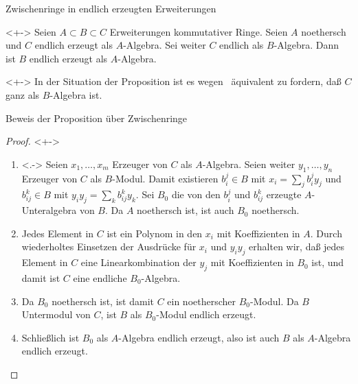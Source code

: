 \begin{frame}{Zwischenringe in endlich erzeugten Erweiterungen}
	\begin{proposition}<+->
		\label{prop:intermediate_ring}
		Seien \(A \subset B \subset C\) Erweiterungen kommutativer Ringe. Seien \(A\) noethersch
		und \(C\) endlich erzeugt als \(A\)-Algebra. Sei weiter \(C\) endlich als \(B\)-Algebra.
		Dann ist \(B\) endlich erzeugt als \(A\)-Algebra.
	\end{proposition}
	\begin{remark}<+->
		In der Situation der Proposition ist es wegen~ äquivalent zu fordern, daß \(C\) ganz als \(B\)-Algebra ist.
	\end{remark}
\end{frame}

\begin{frame}{Beweis der Proposition über Zwischenringe}
	\begin{proof}<+->
		\begin{enumerate}[<+->]
		\item<.->
			Seien \(x_1, \dotsc, x_m\) Erzeuger von \(C\) als \(A\)-Algebra. Seien weiter
			\(y_1, \dotsc, y_n\) Erzeuger von \(C\) als \(B\)-Modul. Damit existieren
			\(b_i^j \in B\) mit \(x_i = \sum\limits_j b_i^j y_j\) und \(b_{ij}^k \in B\)
			mit \(y_i y_j = \sum\limits_k b_{ij}^k y_k\). Sei \(B_0\) die von den \(b_i^j\) und
			\(b_{ij}^k\) erzeugte \(A\)-Unteralgebra von \(B\). Da \(A\)
			noethersch ist, ist auch \(B_0\) noethersch.
		\item
			Jedes Element in \(C\) ist ein Polynom in den \(x_i\) mit Koeffizienten in \(A\).
			Durch wiederholtes Einsetzen der Ausdrücke für \(x_i\) und \(y_i y_j\) erhalten wir,
			daß jedes Element in \(C\) eine Linearkombination der \(y_j\) mit Koeffizienten
			in \(B_0\) ist, und damit ist \(C\) eine endliche \(B_0\)-Algebra.
		\item
			Da \(B_0\) noethersch ist, ist damit \(C\) ein noetherscher \(B_0\)-Modul.
			Da \(B\) Untermodul von	\(C\), ist \(B\) als \(B_0\)-Modul endlich erzeugt.
		\item
			Schließlich ist \(B_0\) als \(A\)-Algebra endlich erzeugt, also ist
			auch \(B\) als \(A\)-Algebra endlich erzeugt.
		\qedhere
		\end{enumerate}
	\end{proof}
\end{frame}

